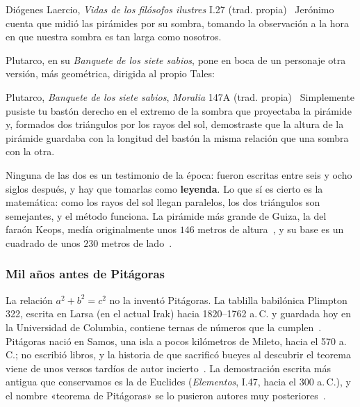 \documentclass[11pt]{article}
\begin{document}
\begin{cita}{Diógenes Laercio, \emph{Vidas de los filósofos ilustres} I.27 (trad. propia)~\cite{diogenes}}
Jerónimo cuenta que midió las pirámides por su sombra, tomando la
observación a la hora en que nuestra sombra es tan larga como nosotros.
\end{cita}

Plutarco, en su \emph{Banquete de los siete sabios}, pone en boca de un
personaje otra versión, más geométrica, dirigida al propio Tales:

\begin{cita}{Plutarco, \emph{Banquete de los siete sabios}, \emph{Moralia} 147A (trad. propia)~\cite{plutarco}}
Simplemente pusiste tu bastón derecho en el extremo de la sombra que
proyectaba la pirámide y, formados dos triángulos por los rayos del sol,
demostraste que la altura de la pirámide guardaba con la longitud del
bastón la misma relación que una sombra con la otra.
\end{cita}

Ninguna de las dos es un testimonio de la época: fueron escritas entre seis
y ocho siglos después, y hay que tomarlas como \textbf{leyenda}. Lo que sí
es cierto es la matemática: como los rayos del sol llegan paralelos, los dos
triángulos son semejantes, y el método funciona. La pirámide más grande de
Guiza, la del faraón Keops, medía originalmente unos $146$ metros de
altura~\cite{egipto}, y su base es un cuadrado de unos $230$ metros de
lado~\cite{elgabry}.

\subsubsection*{Mil años antes de Pitágoras}

La relación $a^2 + b^2 = c^2$ no la inventó Pitágoras. La tablilla
babilónica Plimpton 322, escrita en Larsa (en el actual Irak) hacia
1820--1762 a.\,C. y guardada hoy en la Universidad de Columbia, contiene
ternas de números que la cumplen~\cite{columbia}. Pitágoras nació en Samos,
una isla a pocos kilómetros de Mileto, hacia el 570 a.\,C.; no escribió
libros, y la historia de que sacrificó bueyes al descubrir el teorema viene
de unos versos tardíos de autor incierto~\cite{huffman}. La demostración
escrita más antigua que conservamos es la de Euclides (\emph{Elementos},
I.47, hacia el 300 a.\,C.), y el nombre «teorema de Pitágoras» se lo
pusieron autores muy posteriores~\cite{euclidesI47, maor}.
\end{document}
